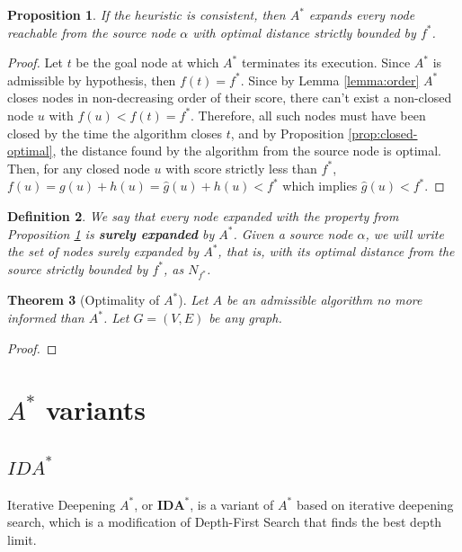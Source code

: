 \documentclass[12pt]{report}
\newtheorem{theorem}{Theorem}[chapter]
\newtheorem{definition}[theorem]{Definition}
\newtheorem{proposition}[theorem]{Proposition}
\begin{document}
\begin{proposition}
\label{prop:surely}
If the heuristic is consistent, then $A^*$ expands every node reachable from the source node $\alpha$ with optimal distance strictly bounded by $f^*$.
\end{proposition}
\begin{proof}
Let $t$ be the goal node at which $A^*$ terminates its execution. Since $A^*$ is admissible by hypothesis, then $f(t) = f^*$. Since by Lemma \ref{lemma:order} $A^*$ closes nodes in non-decreasing order of their score, there can't exist a non-closed node $u$ with $f(u) < f(t) = f^*$. Therefore, all such nodes must have been closed by the time the algorithm closes $t$, and by Proposition \ref{prop:closed-optimal}, the distance found by the algorithm from the source node is optimal. Then, for any closed node $u$ with score strictly less than $f^*$, $f(u) = g(u) + h(u) = \hat{g}(u) + h(u) < f^*$ which implies $\hat{g}(u) < f^*$.
\end{proof}

\begin{definition}
We say that every node expanded with the property from Proposition \ref{prop:surely} is \textbf{surely expanded} by $A^*$. Given a source node $\alpha$, we will write the set of nodes surely expanded by $A^*$, that is, with its optimal distance from the source strictly bounded by $f^*$, as $N_{f^*}$.
\end{definition}

\begin{theorem}[Optimality of $A^*$]
Let $A$ be an admissible algorithm no more informed than $A^*$. Let $G=(V,E)$ be any graph.
\end{theorem}
\begin{proof}
\end{proof}


\chapter{$A^*$ variants}

\section{$IDA^*$}
Iterative Deepening $A^*$, or $\bm{IDA^*}$, is a variant of $A^*$ based on iterative deepening search, which is a modification of Depth-First Search that finds the best depth limit. %


\end{document}
